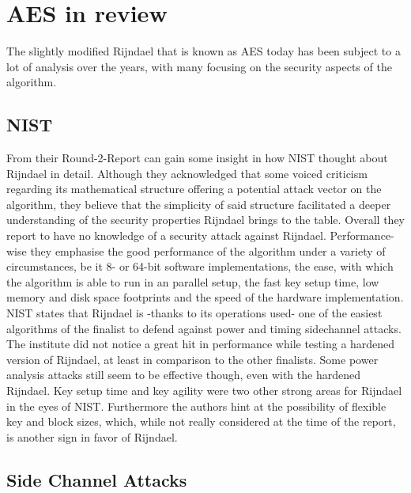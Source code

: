 \section{AES in review}
\label{ch:aes-review}

The slightly modified Rijndael that is known as AES today has been subject to a lot of analysis over the years, with many focusing on the security aspects of the algorithm.

\subsection{NIST}
\label{ch:nist-review}

From their Round-2-Report \cite{round2report} can gain some insight in how NIST thought about Rijndael in detail.
Although they acknowledged that some voiced criticism regarding its mathematical structure offering a potential attack vector on the algorithm, they believe that the simplicity of said structure facilitated a deeper understanding of the security properties Rijndael brings to the table. Overall they report to have no knowledge of a security attack against Rijndael.
Performance-wise they emphasise the good performance of the algorithm under a variety of circumstances, be it 8- or 64-bit software implementations, the ease, with which the algorithm is able to run in an parallel setup, the fast key setup time, low memory and disk space footprints and the speed of the hardware implementation.
NIST states that Rijndael is -thanks to its operations used- one of the easiest algorithms of the finalist to defend against power and timing sidechannel attacks. The institute did not notice a great hit in performance while testing a hardened version of Rijndael, at least in comparison to the other finalists. Some power analysis attacks still seem to be effective though, even with the hardened Rijndael.
Key setup time and key agility were two other strong areas for Rijndael in the eyes of NIST. Furthermore the authors hint at the possibility of flexible key and block sizes, which, while not really considered at the time of the report, is another sign in favor of Rijndael.

\subsection{Side Channel Attacks}
\label{ch:sidechannelattacks}

